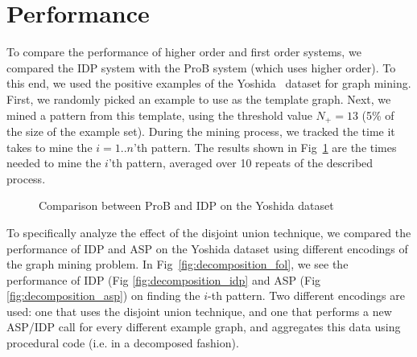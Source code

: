 \section{Performance}\label{sec:performance}
To compare the performance of higher order and first order systems, we compared the IDP system with the ProB system (which uses higher order).
To this end, we used the positive examples of the Yoshida~\citep{yoshida_dataset} dataset for graph mining.
First, we randomly picked an example to use as the template graph.
Next, we mined a pattern from this template, using the threshold value $N_{+} = 13$ (5\% of the size of the example set).
During the mining process, we tracked the time it takes to mine the $i=1..n$'th pattern.
The results shown in Fig~\ref{fig:ProBIDPComp} are the times needed to mine the $i$'th pattern, averaged over 10 repeats of the described process.

\begin{figure}
\caption{Comparison between ProB and IDP on the Yoshida dataset}
\label{fig:ProBIDPComp}
\end{figure}



To specifically analyze the effect of the disjoint union technique, we compared the performance of IDP and ASP on the Yoshida dataset using different encodings of the graph mining problem.
In Fig~\ref{fig:decomposition_fol}, we see the performance of IDP (Fig \ref{fig:decomposition_idp} and ASP (Fig \ref{fig:decomposition_asp}) on finding the $i$-th pattern.
Two different encodings are used: one that uses the disjoint union technique, and one that performs a new ASP/IDP call for every different example graph, and aggregates this data using procedural code (i.e. in a decomposed fashion).


